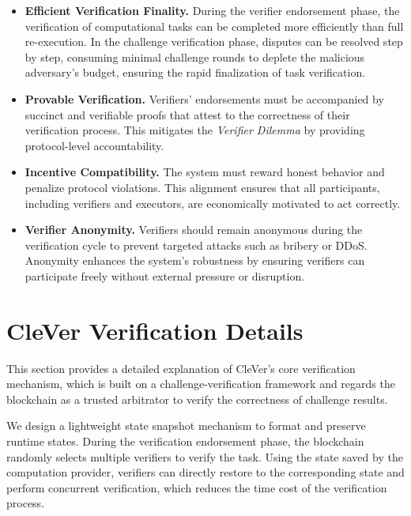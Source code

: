 \documentclass[3p]{elsarticle}
\theoremstyle{remark}
\begin{document}
\begin{itemize}
    \item \textbf{Efficient Verification Finality.} During the verifier endorsement phase, the verification of computational tasks can be completed more efficiently than full re-execution. In the challenge verification phase, disputes can be resolved step by step, consuming minimal challenge rounds to deplete the malicious adversary's budget, ensuring the rapid finalization of task verification.
    
    \item \textbf{Provable Verification.} Verifiers’ endorsements must be accompanied by succinct and verifiable proofs that attest to the correctness of their verification process. This mitigates the \emph{Verifier Dilemma} by providing protocol-level accountability.

    \item \textbf{Incentive Compatibility.} The system must reward honest behavior and penalize protocol violations. This alignment ensures that all participants, including verifiers and executors, are economically motivated to act correctly.

    \item \textbf{Verifier Anonymity.} Verifiers should remain anonymous during the verification cycle to prevent targeted attacks such as bribery or DDoS. Anonymity enhances the system's robustness by ensuring verifiers can participate freely without external pressure or disruption.
    
\end{itemize}


\section{CleVer Verification Details}

This section provides a detailed explanation of CleVer's core verification mechanism, which is built on a challenge-verification framework and regards the blockchain as a trusted arbitrator to verify the correctness of challenge results.  

We design a lightweight state snapshot mechanism to format and preserve runtime states. During the verification endorsement phase, the blockchain randomly selects multiple verifiers to verify the task. Using the state saved by the computation provider, verifiers can directly restore to the corresponding state and perform concurrent verification, which reduces the time cost of the verification process.
\end{document}
